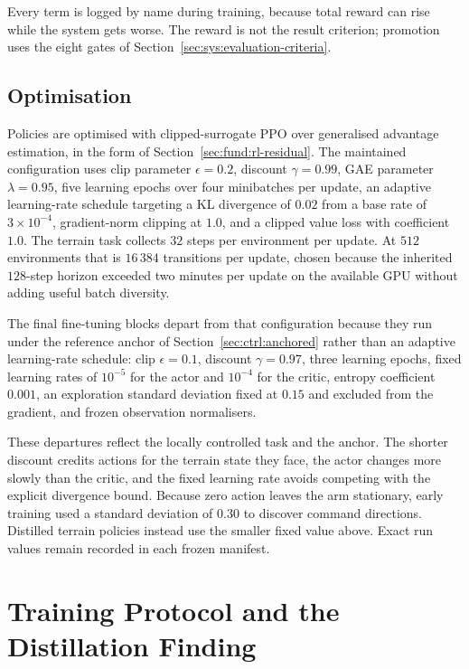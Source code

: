 Every term is logged by name during training, because total reward can rise
while the system gets worse. The reward is not the result criterion; promotion
uses the eight gates of Section~\ref{sec:sys:evaluation-criteria}.

\subsection{Optimisation}
\label{sec:ctrl:optimization}

Policies are optimised with clipped-surrogate PPO over generalised advantage
estimation, in the form of Section~\ref{sec:fund:rl-residual}. The maintained
configuration uses clip parameter $\epsilon = 0.2$, discount $\gamma = 0.99$,
GAE parameter $\lambda = 0.95$, five learning epochs over four minibatches per
update, an adaptive learning-rate schedule targeting a KL divergence of $0.02$
from a base rate of $3\times10^{-4}$, gradient-norm clipping at $1.0$, and a
clipped value loss with coefficient $1.0$. The terrain task collects $32$ steps
per environment per update. At $512$ environments that is $16\,384$ transitions
per update, chosen because the inherited $128$-step horizon exceeded two
minutes per update on the available GPU without adding useful batch diversity.

The final fine-tuning blocks depart from that configuration because they run
under the reference anchor of Section~\ref{sec:ctrl:anchored} rather than an
adaptive learning-rate schedule: clip $\epsilon = 0.1$, discount
$\gamma = 0.97$, three learning epochs, fixed learning rates of $10^{-5}$ for
the actor and $10^{-4}$ for the critic, entropy coefficient $0.001$, an
exploration standard deviation fixed at $0.15$ and excluded from the gradient,
and frozen observation normalisers.

These departures reflect the locally controlled task and the anchor. The shorter
discount credits actions for the terrain state they face, the actor changes more
slowly than the critic, and the fixed learning rate avoids competing with the
explicit divergence bound. Because zero action leaves the arm stationary, early
training used a standard deviation of $0.30$ to discover command directions.
Distilled terrain policies instead use the smaller fixed value above. Exact run
values remain recorded in each frozen manifest.

\section{Training Protocol and the Distillation Finding}
\label{sec:ctrl:training}

